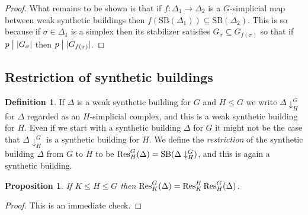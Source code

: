 \documentclass[12pt]{amsart}
\theoremstyle{plain}
\newtheorem{proposition}[theorem]{Proposition}
\theoremstyle{definition}
\newtheorem{definition}[theorem]{Definition}
\theoremstyle{remark}
\numberwithin{equation}{section}
\DeclareMathOperator \Res{\mathop{\rm Res}\nolimits}
\DeclareMathOperator \SB{\mathop{\rm SB}\nolimits}
\begin{document}
\begin{proof}
    What remains to be shown is that if $f:\Delta_1\to\Delta_2$ is a $G$-simplicial map between weak synthetic buildings then $f(\mathrm{SB}(\Delta_1))\subseteq \mathrm{SB}(\Delta_2)$. This is so because if $\sigma\in\Delta_1$ is a simplex then its stabilizer satisfies $G_\sigma\subseteq G_{f(\sigma)}$ so that if $p\bigm| |G_\sigma|$ then $p\bigm| |G_{f(\sigma)}|$. 
\end{proof}

\subsection{Restriction of synthetic buildings}
\begin{definition}
    If $\Delta$ is a weak synthetic building for $G$ and $H\le G$ we write $\Delta\downarrow_H^G$ for $\Delta$ regarded as an $H$-simplicial complex, and this is a weak synthetic building for $H$. Even if we start with a synthetic building $\Delta$ for $G$ it might not be the case that $\Delta\downarrow_H^G$ is a synthetic building for $H$. We define the  \textit{restriction} of the synthetic building $\Delta$ from $G$ to $H$ to be $\Res_H^G(\Delta)=\SB(\Delta\downarrow_H^G)$, and this is again a synthetic building.
\end{definition}

\begin{proposition}
    If $K\le H\le G$ then $\Res_K^G(\Delta) = \Res_K^H\Res_H^G(\Delta)$.
\end{proposition}

\begin{proof}
    This is an immediate check.
\end{proof}
\end{document}
